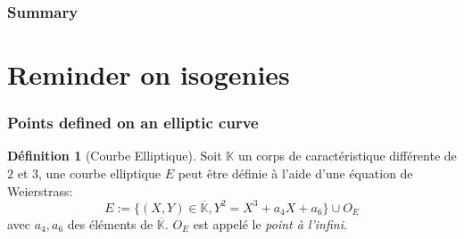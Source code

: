 \documentclass[10pt,a4paper]{beamer}
\theoremstyle{plain}
\theoremstyle{definition}
\theoremstyle{definition}
\theoremstyle{definition}
\theoremstyle{definition}
\newtheorem{defi}[thm]{Définition}
\theoremstyle{remark}
\theoremstyle{remark}
\begin{document}
\begin{frame}
\frametitle{Summary}
\tableofcontents
\end{frame}

\section{Reminder on isogenies}

\begin{frame}
\frametitle{Points defined on an elliptic curve}

\begin{defi}[Courbe Elliptique]
Soit $\mathbb{K}$ un corps de caractéristique différente de $2$ et $3$, une courbe elliptique $E$ peut être définie à l'aide d'une équation de Weierstrass: 
\begin{equation*}
\label{eq:weierstrass-proj}
E:=\{ (X,Y) \in \overline{\mathbb{K}} , Y^2=X^3+a_4X+a_6 \} \cup O_E
\end{equation*}
avec $a_4,a_6$ des éléments de $\overline{\mathbb{K}}$. $O_E$ est appelé le \emph{point à l'infini}. 
\end{defi}

\begin{figure}
\begin{center}

\end{center}
\end{figure}
\end{frame}
\end{document}
